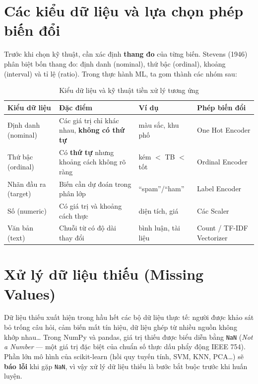 \section{Các kiểu dữ liệu và lựa chọn phép biến đổi}

Trước khi chọn kỹ thuật, cần xác định \textbf{thang đo} của từng biến. Stevens (1946) phân biệt bốn thang đo: định danh (nominal), thứ bậc (ordinal), khoảng (interval) và tỉ lệ (ratio). Trong thực hành ML, ta gom thành các nhóm sau:

\begin{table}[H]
\centering
\begin{tabular}{|p{2.8cm}|p{4.2cm}|p{3cm}|p{3.4cm}|}
\hline
\textbf{Kiểu dữ liệu} & \textbf{Đặc điểm} & \textbf{Ví dụ} & \textbf{Phép biến đổi} \\
\hline
Định danh (nominal) & Các giá trị chỉ khác nhau, \textbf{không có thứ tự} & màu sắc, khu phố & One Hot Encoder \\
\hline
Thứ bậc (ordinal) & Có \textbf{thứ tự} nhưng khoảng cách không rõ ràng & kém $<$ TB $<$ tốt & Ordinal Encoder \\
\hline
Nhãn đầu ra (target) & Biến cần dự đoán trong phân lớp & ``spam''/``ham'' & Label Encoder \\
\hline
Số (numeric) & Có giá trị và khoảng cách thực & diện tích, giá & Các Scaler \\
\hline
Văn bản (text) & Chuỗi từ có độ dài thay đổi & bình luận, tài liệu & Count / TF-IDF Vectorizer \\
\hline
\end{tabular}
\caption{Kiểu dữ liệu và kỹ thuật tiền xử lý tương ứng}
\label{tab:datatypes}
\end{table}

\section{Xử lý dữ liệu thiếu (Missing Values)}
\label{sec:missing}

Dữ liệu thiếu xuất hiện trong hầu hết các bộ dữ liệu thực tế: người được khảo sát bỏ trống câu hỏi, cảm biến mất tín hiệu, dữ liệu ghép từ nhiều nguồn không khớp nhau\ldots{} Trong NumPy và pandas, giá trị thiếu được biểu diễn bằng \texttt{NaN} (\textit{Not a Number} --- một giá trị đặc biệt của chuẩn số thực dấu phẩy động IEEE 754). Phần lớn mô hình của scikit-learn (hồi quy tuyến tính, SVM, KNN, PCA\ldots) sẽ \textbf{báo lỗi} khi gặp \texttt{NaN}, vì vậy xử lý dữ liệu thiếu là bước bắt buộc trước khi huấn luyện.


